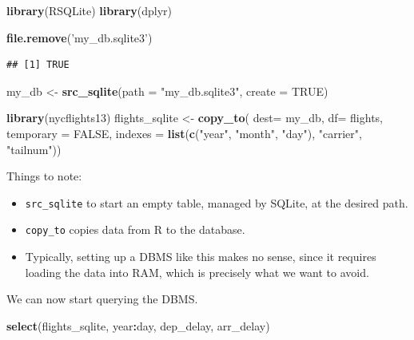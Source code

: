 \documentclass[]{book}
\newenvironment{Shaded}{\begin{snugshade}}{\end{snugshade}}
\newcommand{\KeywordTok}[1]{\textcolor[rgb]{0.13,0.29,0.53}{\textbf{#1}}}
\newcommand{\DataTypeTok}[1]{\textcolor[rgb]{0.13,0.29,0.53}{#1}}
\newcommand{\StringTok}[1]{\textcolor[rgb]{0.31,0.60,0.02}{#1}}
\newcommand{\OtherTok}[1]{\textcolor[rgb]{0.56,0.35,0.01}{#1}}
\newcommand{\OperatorTok}[1]{\textcolor[rgb]{0.81,0.36,0.00}{\textbf{#1}}}
\newcommand{\NormalTok}[1]{#1}
\providecommand{\tightlist}{%
  \setlength{\itemsep}{0pt}\setlength{\parskip}{0pt}}
\theoremstyle{definition}
\theoremstyle{definition}
\theoremstyle{definition}
\theoremstyle{remark}
\begin{document}
\begin{Shaded}
\begin{Highlighting}[]
\KeywordTok{library}\NormalTok{(RSQLite)}
\KeywordTok{library}\NormalTok{(dplyr)}

\KeywordTok{file.remove}\NormalTok{(}\StringTok{'my_db.sqlite3'}\NormalTok{)}
\end{Highlighting}
\end{Shaded}

\begin{verbatim}
## [1] TRUE
\end{verbatim}

\begin{Shaded}
\begin{Highlighting}[]
\NormalTok{my_db <-}\StringTok{ }\KeywordTok{src_sqlite}\NormalTok{(}\DataTypeTok{path =} \StringTok{"my_db.sqlite3"}\NormalTok{, }\DataTypeTok{create =} \OtherTok{TRUE}\NormalTok{)}

\KeywordTok{library}\NormalTok{(nycflights13)}
\NormalTok{flights_sqlite <-}\StringTok{ }\KeywordTok{copy_to}\NormalTok{(}
  \DataTypeTok{dest=}\NormalTok{ my_db, }
  \DataTypeTok{df=}\NormalTok{ flights, }
  \DataTypeTok{temporary =} \OtherTok{FALSE}\NormalTok{, }
  \DataTypeTok{indexes =} \KeywordTok{list}\NormalTok{(}\KeywordTok{c}\NormalTok{(}\StringTok{"year"}\NormalTok{, }\StringTok{"month"}\NormalTok{, }\StringTok{"day"}\NormalTok{), }\StringTok{"carrier"}\NormalTok{, }\StringTok{"tailnum"}\NormalTok{))}
\end{Highlighting}
\end{Shaded}

Things to note:

\begin{itemize}
\tightlist
\item
  \texttt{src\_sqlite} to start an empty table, managed by SQLite, at
  the desired path.
\item
  \texttt{copy\_to} copies data from R to the database.
\item
  Typically, setting up a DBMS like this makes no sense, since it
  requires loading the data into RAM, which is precisely what we want to
  avoid.
\end{itemize}

We can now start querying the DBMS.

\begin{Shaded}
\begin{Highlighting}[]
\KeywordTok{select}\NormalTok{(flights_sqlite, year}\OperatorTok{:}\NormalTok{day, dep_delay, arr_delay)}
\end{Highlighting}
\end{Shaded}
\end{document}
